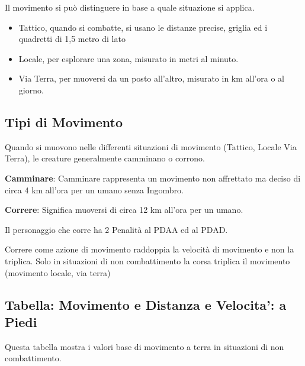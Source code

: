 \documentclass[12pt,a4paper,twoside,openany]{book}
\begin{document}
\begin{multicols}{2}

Il movimento si può distinguere in base a quale situazione si applica.

\medskip

\begin{itemize}
\item Tattico, quando si combatte, si usano le distanze precise, griglia ed i quadretti di 1,5 metro di lato
\item Locale, per esplorare una zona, misurato in metri al minuto.
\item Via Terra, per muoversi da un posto all'altro, misurato in km all'ora o al giorno.
\end{itemize}

\subsection{Tipi di Movimento}\label{tipodimovimento}

Quando si muovono nelle differenti situazioni di movimento (Tattico, Locale Via Terra), le creature generalmente camminano o corrono.

\textbf{Camminare}: Camminare rappresenta un movimento non affrettato ma deciso di circa 4 km all'ora per un umano senza Ingombro.

\textbf{Correre}: Significa muoversi di circa 12 km all'ora per un umano.

Il personaggio che corre ha 2 Penalità al PDAA ed al PDAD.

Correre come azione di movimento raddoppia la velocità di movimento e non la triplica. Solo in situazioni di non combattimento la corsa triplica il movimento (movimento locale, via terra)

\subsection{Tabella: Movimento e Distanza e Velocita': a Piedi}

Questa tabella mostra i valori base di movimento a terra in situazioni di non combattimento.

\bigskip


\end{multicols}
\end{document}
